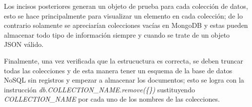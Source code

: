 Los incisos posteriores generan un objeto de prueba para cada colección de datos, esto se hace principalmente para visualizar un elemento en cada colección; de lo contrario solamente se apreciarían colecciones vacías en MongoDB y estas pueden almacenar todo tipo de información siempre y cuando se trate de un objeto JSON válido.


Finalmente, una vez verificada que la estrucuctura es correcta, se deben truncar todas las colecciones y de esta manera tener un esquema de la base de datos NoSQL sin registros y empezar a almacenar los documentos; esto se logra con la instrucción \textit{db.COLLECTION\_NAME.remove(\{\})} sustituyendo \textit{COLLECTION\_NAME} por cada uno de los nombres de las colecciones.
